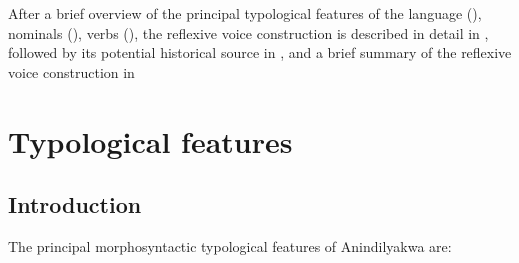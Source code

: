 \documentclass[output=paper]{langscibook}
\begin{document}
 After a brief overview of the principal typological features of the language (), nominals (), verbs (), the reflexive voice construction is described in detail in , followed by its potential historical source in , and a brief summary of the reflexive voice construction in 



\section{Typological features}
\label{sec:vanegmond:2}



\subsection{Introduction}\label{sec:vanegmond:2.1}



The principal morphosyntactic typological features of Anindilyakwa are:
\end{document}
